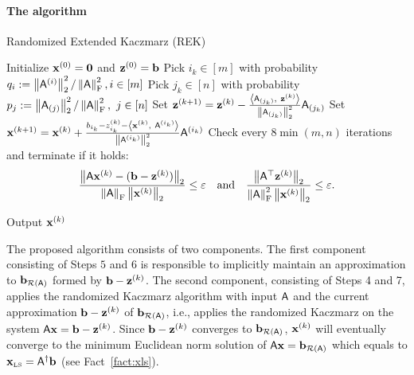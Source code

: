\paragraph{The algorithm}
%
\begin{algorithm}{}
	\caption{Randomized Extended Kaczmarz (REK)}\label{alg:REK}
\begin{algorithmic}[1]
\Procedure{}{$\matA$, $\b$, $\eps$}
\State Initialize $\x^{(0)}=\zeromtx$ and $\z^{(0)} =\b$
	\State Pick $i_k\in[m]$ with probability $q_i:=\norm{\ar{i}}^2/\frobnorm{\matA}^2, i\in [m]$
	\State Pick $j_k\in[n]$ with probability $p_j:=\norm{\ac{j}}^2/\frobnorm{\matA}^2,\ j\in [n]$
	\State Set $ \z^{(k+1)} = \z^{(k)} - \frac{\ip{\ac{j_k}}{\z^{(k)}}}{\norm{\ac{j_k}}^2}\ac{j_k}  $
	\State Set $ \x^{(k+1)} = \x^{(k)}  + \frac{b_{i_k} - z^{(k)}_{i_k} - \ip{\x^{(k)}}{\ar{i_k} }}{\norm{\ar{i_k}}^2} \ar{i_k}$
	\State\label{alg:stopping} Check every $8 \min (m,n)$ iterations and terminate if it holds:
	\[  \frac{\norm{\matA \x^{(k)} - (\b - \z^{(k)}) }}{\frobnorm{\matA} \norm{\x^{(k)}}}  \leq \eps \quad\text{and} \quad \frac{\norm{\matA^\top \z^{(k)}}}{\frobnorm{\matA}^2\norm{\x^{(k)}}} \leq \eps.\]

\EndFor
\State Output $\x^{(k)}$
\EndProcedure
\end{algorithmic}
\end{algorithm}
%
%
The proposed algorithm consists of two components. The first component consisting of Steps $5$ and $6$ is responsible to implicitly maintain an approximation to $\br$ formed by $\b-\z^{(k)}$. The second component, consisting of Steps 4 and 7, applies the randomized Kaczmarz algorithm with input $\matA$ and the current approximation $\b -\z^{(k)}$ of $\br$, i.e., applies the randomized Kaczmarz on the system $\matA \x = \b - \z^{(k)}$. Since $\b - \z^{(k)}$ converges to $\br$, $\x^{(k)}$ will eventually converge to the minimum Euclidean norm solution of $\matA \x = \br$ which equals to $\xls=\pinv{\matA}\b$ (see Fact~\ref{fact:xls}).
%

